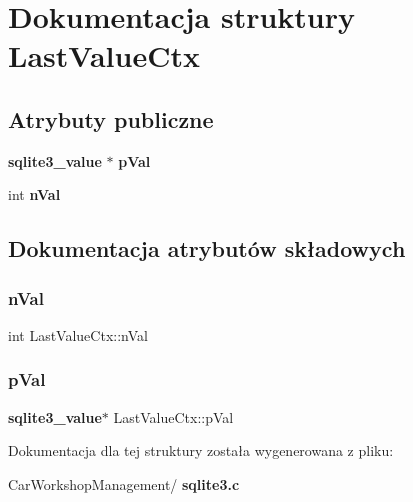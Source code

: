 \section{Dokumentacja struktury Last\+Value\+Ctx}
\label{struct_last_value_ctx}
\subsection*{Atrybuty publiczne}
\begin{DoxyCompactItemize}
\item 
\textbf{ sqlite3\+\_\+value} $\ast$ \textbf{ p\+Val}
\item 
int \textbf{ n\+Val}
\end{DoxyCompactItemize}


\subsection{Dokumentacja atrybutów składowych}
\mbox{\label{struct_last_value_ctx_a167a70e015c39fb489b0c042a63404ac}} 
\subsubsection{nVal}
{\footnotesize\ttfamily int Last\+Value\+Ctx\+::n\+Val}

\mbox{\label{struct_last_value_ctx_a612cf29db58080c03d874a2b2085f8f8}} 
\subsubsection{pVal}
{\footnotesize\ttfamily \textbf{ sqlite3\+\_\+value}$\ast$ Last\+Value\+Ctx\+::p\+Val}



Dokumentacja dla tej struktury została wygenerowana z pliku\+:\begin{DoxyCompactItemize}
\item 
Car\+Workshop\+Management/\textbf{ sqlite3.\+c}\end{DoxyCompactItemize}
